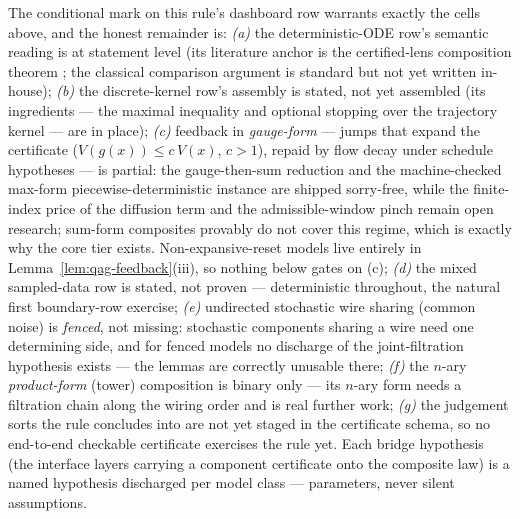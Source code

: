 \begin{bremark}
\label{rem:qag-gaps}
The conditional mark on this rule's dashboard row warrants exactly the
cells above, and the honest remainder is:
\emph{(a)} the deterministic-ODE row's semantic reading is at
statement level (its literature anchor is the certified-lens
composition theorem \cite{capuccimyers2026}; the classical comparison
argument is standard but not yet written in-house);
\emph{(b)} the discrete-kernel row's assembly is stated, not yet
assembled (its ingredients --- the maximal inequality and optional
stopping over the trajectory kernel --- are in place);
\emph{(c)} feedback in \emph{gauge-form} --- jumps that expand the
certificate ($V(g(x)) \leq c\,V(x)$, $c > 1$), repaid by flow decay
under schedule hypotheses --- is partial: the gauge-then-sum reduction
and the machine-checked max-form piecewise-deterministic instance are
shipped sorry-free, while the finite-index price of the diffusion term
and the admissible-window pinch remain open research; sum-form
composites provably do not cover this regime, which is exactly why the
core tier exists. Non-expansive-reset models live entirely in
Lemma~\ref{lem:qag-feedback}(iii), so nothing below gates on (c);
\emph{(d)} the mixed sampled-data row is stated, not proven ---
deterministic throughout, the natural first boundary-row exercise;
\emph{(e)} undirected stochastic wire sharing (common noise) is
\emph{fenced}, not missing: stochastic components sharing a wire need
one determining side, and for fenced models no discharge of the
joint-filtration hypothesis exists --- the lemmas are correctly
unusable there;
\emph{(f)} the $n$-ary \emph{product-form} (tower) composition is
binary only --- its $n$-ary form needs a filtration chain along the
wiring order and is real further work;
\emph{(g)} the judgement sorts the rule concludes into are not yet
staged in the certificate schema, so no end-to-end checkable
certificate exercises the rule yet. Each bridge hypothesis
(the interface layers carrying a component certificate onto the
composite law) is a named hypothesis discharged per model class ---
parameters, never silent assumptions.
\end{bremark}

